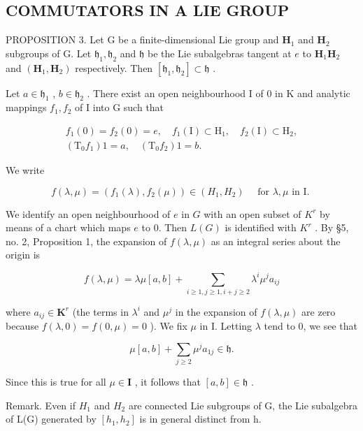 \subsection{COMMUTATORS IN A LIE GROUP}

PROPOSITION 3. Let G be a finite-dimensional Lie group and \(\mathbf{H}_1\) and \(\mathbf{H}_2\) subgroups of G. Let \(\mathfrak{h}_1, \mathfrak{h}_2\) and \(\mathfrak{h}\) be the Lie subalgebras tangent at \(e\) to \(\mathbf{H}_1\mathbf{H}_2\) and \((\mathbf{H}_1,\mathbf{H}_2)\) respectively. Then \([\mathfrak{h}_1,\mathfrak{h}_2] \subset \mathfrak{h}\) .

Let \(a \in \mathfrak{h}_1\) , \(b \in \mathfrak{h}_2\) . There exist an open neighbourhood I of 0 in K and analytic mappings \(f_1, f_2\) of I into G such that

\[
\begin{array}{c} f _ {1} (0) = f _ {2} (0) = e, \quad f _ {1} (\mathrm{I}) \subset \mathrm{H} _ {1}, \quad f _ {2} (\mathrm{I}) \subset \mathrm{H} _ {2}, \\ (\mathrm{T} _ {0} f _ {1}) 1 = a, \quad (\mathrm{T} _ {0} f _ {2}) 1 = b. \end{array}
\]

We write

\[
f (\lambda , \mu) = (f _ {1} (\lambda), f _ {2} (\mu)) \in (H _ {1}, H _ {2}) \quad \text { for   } \lambda , \mu \text {   in   I. }
\]

We identify an open neighbourhood of \(e\) in \(G\) with an open subset of \(K^r\) by means of a chart which maps \(e\) to 0. Then \(L(G)\) is identified with \(K^r\) . By §5, no. 2, Proposition 1, the expansion of \(f(\lambda, \mu)\) as an integral series about the origin is

\[
f (\lambda , \mu) = \lambda \mu [ a, b ] + \sum_ {i \geqslant 1, j \geqslant 1, i + j \geqslant 2} \lambda^ {i} \mu^ {j} a _ {i j}
\]

where \(a_{ij} \in \mathbf{K}^r\) (the terms in \(\lambda^i\) and \(\mu^j\) in the expansion of \(f(\lambda, \mu)\) are zero because \(f(\lambda, 0) = f(0, \mu) = 0\) ). We fix \(\mu\) in I. Letting \(\lambda\) tend to 0, we see that

\[
\mu [ a, b ] + \sum_ {j \geqslant 2} \mu^ {j} a _ {1 j} \in \mathfrak {h}.
\]

Since this is true for all \(\mu\in\mathbf{I}\) , it follows that \([a,b]\in\mathfrak{h}\) .

Remark. Even if \(H_{1}\) and \(H_{2}\) are connected Lie subgroups of G, the Lie subalgebra of L(G) generated by \([h_{1}, h_{2}]\) is in general distinct from h.

